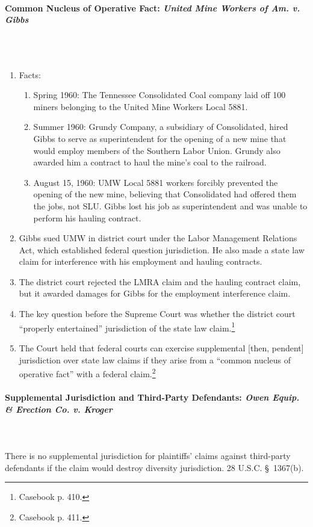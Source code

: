 \paragraph{Common Nucleus of Operative Fact: \emph{United Mine Workers of Am. 
v. Gibbs}} %
~\\\\
\begin{enumerate}
    \item Facts:
    \begin{enumerate}
        \item Spring 1960: The Tennessee Consolidated Coal company laid off 
        100 miners belonging to the United Mine Workers Local 5881.
        \item Summer 1960: Grundy Company, a subsidiary of Consolidated, hired 
        Gibbs to serve as superintendent for the opening of a new mine that 
        would employ members of the Southern Labor Union. Grundy also awarded 
        him a contract to haul the mine's coal to the railroad.
        \item August 15, 1960: UMW Local 5881 workers forcibly prevented the 
        opening of the new mine, believing that Consolidated had offered them 
        the jobs, not SLU. Gibbs lost his job as superintendent and was unable 
        to perform his hauling contract.
    \end{enumerate}
    \item Gibbs sued UMW in district court under the Labor Management 
    Relations Act, which established federal question jurisdiction. He also 
    made a state law claim for interference with his employment and hauling 
    contracts.
    \item The district court rejected the LMRA claim and the hauling contract 
    claim, but it awarded damages for Gibbs for the employment interference 
    claim.
    \item The key question before the Supreme Court was whether the district 
    court ``properly entertained'' jurisdiction of the state law 
    claim.\footnote{Casebook p. 410.}
    \item The Court held that federal courts can exercise supplemental [then, 
    pendent] jurisdiction over state law claims if they arise from a ``common 
    nucleus of operative fact'' with a federal claim.\footnote{Casebook p.  
    411.}
\end{enumerate}

\paragraph{Supplemental Jurisdiction and Third-Party Defendants: \emph{Owen 
Equip. \& Erection Co. v. Kroger}}
~\\\\
There is no supplemental jurisdiction for plaintiffs' claims against 
third-party defendants if the claim would destroy diversity jurisdiction. 28 
U.S.C. \S\ 1367(b).

